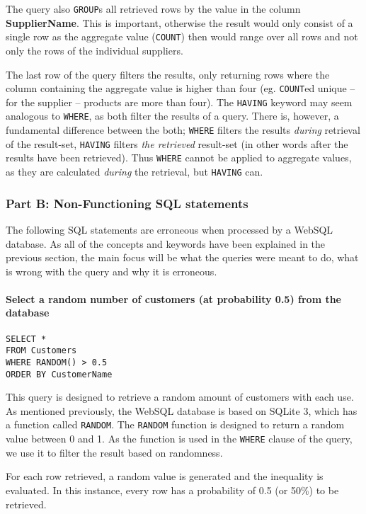 The query also \texttt{GROUP}s all retrieved rows by the value in the
column \textbf{SupplierName}. This is important, otherwise the result
would only consist of a single row as the aggregate value (\texttt{COUNT})
then would range over all rows and not only the rows of the individual
suppliers.

The last row of the query filters the results, only returning rows
where the column containing the aggregate value is higher than four
(eg. \texttt{COUNT}ed unique -- for the supplier -- products are more
than four). The \texttt{HAVING} keyword may seem analogous to \texttt{WHERE},
as both filter the results of a query. There is, however, a fundamental
difference between the both; \texttt{WHERE} filters the results \textit{during}
retrieval of the result-set, \texttt{HAVING} filters \textit{the retrieved}
result-set (in other words after the results have been retrieved). Thus \texttt{WHERE}
cannot be applied to aggregate values, as they are calculated \textit{during} the
retrieval, but \texttt{HAVING} can.

\subsubsection{Part B: Non-Functioning SQL statements}
The following SQL statements are erroneous when processed by a WebSQL database.
As all of the concepts and keywords have been explained in the previous
section, the main focus will be what the queries were meant to do, what is
wrong with the query and why it is erroneous.

\paragraph{Select a random number of customers (at probability 0.5) from the
  database}

\begin{lstlisting}[label={sqlstatement3}]
SELECT *
FROM Customers
WHERE RANDOM() > 0.5
ORDER BY CustomerName
\end{lstlisting}

This query is designed to retrieve a random amount of customers with each
use. As mentioned previously, the WebSQL database is based on SQLite 3,
which has a function called \texttt{RANDOM}. The \texttt{RANDOM} function
is designed to return a random value between 0 and 1. As the function is used
in the \texttt{WHERE} clause of the query, we use it to filter the result
based on randomness.

For each row retrieved, a random value is generated and the inequality is
evaluated. In this instance, every row has a probability of 0.5 (or 50\%)
to be retrieved.

